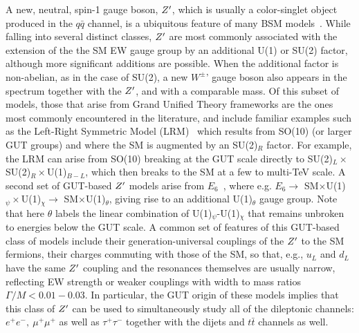 A new, neutral, spin-1 gauge boson, $Z^{\prime}$, which is usually a color-singlet object produced in the $q\bar q$ channel, is a ubiquitous feature of many BSM models~\cite{Langacker:2008yv,Rizzo:2006nw,Carena:2004xs,Salvioni:2009mt}.  While falling into several distinct classes, $Z^{\prime}$ are most commonly associated with the
extension of the the SM EW gauge group by an additional U(1) or SU(2) factor, although more significant additions are possible. When the additional factor is non-abelian,
as in the case of SU(2), a new $W^\pm$' gauge boson  also appears in the spectrum together with the $Z^{\prime}$, and with a comparable mass.  Of this subset of models, those
that arise from Grand Unified Theory frameworks are the ones most commonly encountered in the literature, and include familiar examples such as the Left-Right Symmetric
Model (LRM)~\cite{Senjanovic:1975rk,Mohapatra:1980yp} which results from SO(10)
(or larger GUT groups) and where the SM is augmented by an SU(2)$_R$ factor. For example, the LRM can arise from SO(10) breaking at the GUT scale directly to
SU(2)$_L \times$SU(2)$_R \times$U(1)$_{B-L}$, which then breaks to the SM at a few to multi-TeV scale. A second set of GUT-based $Z^{\prime}$ models arise from
$E_6$~\cite{Robinett:1982tq,London:1986dk,Hewett:1988xc,Joglekar:2016yap}, where e.g. $E_6 \rightarrow$ SM$\times$U(1)$_\psi \times$U(1)$_\chi \rightarrow $ SM$
\times$U(1)$_\theta$, giving rise to an additional U(1)$_\theta$ gauge group. Note that here $\theta$ labels the linear combination of U(1)$_\psi$-U(1)$_\chi$ that remains
unbroken to energies below the GUT scale.  A common set of features of this GUT-based class of models include their generation-universal couplings
of the $Z^{\prime}$ to the SM fermions, their charges commuting with those of the SM, so that, e.g., $u_L$ and $d_L$ have the same $Z^{\prime}$ coupling and the resonances themselves are usually
narrow, reflecting EW strength or weaker couplings with width to mass ratios $\Gamma/M < 0.01-0.03$. In particular, the GUT origin of these models
implies that this class of $Z^{\prime}$ can be used to simultaneously study all of the dileptonic channels: $e^+e^-,~\mu^+\mu^+$ as well as $\tau^+\tau^-$ together with the dijets and 
$t\bar t$ channels as well.

